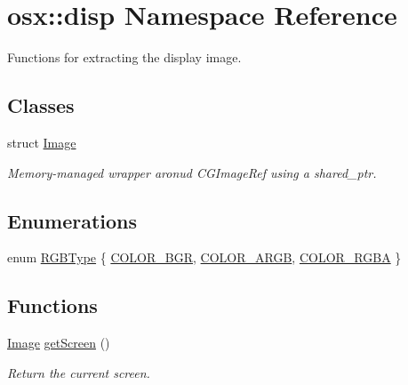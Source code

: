 \hypertarget{namespaceosx_1_1disp}{\section{osx\-:\-:disp Namespace Reference}
\label{namespaceosx_1_1disp}
}


Functions for extracting the display image.  


\subsection*{Classes}
\begin{DoxyCompactItemize}
\item 
struct \hyperlink{structosx_1_1disp_1_1_image}{Image}
\begin{DoxyCompactList}\small\item\em Memory-\/managed wrapper aronud {\ttfamily C\-G\-Image\-Ref} using a {\ttfamily shared\-\_\-ptr}. \end{DoxyCompactList}\end{DoxyCompactItemize}
\subsection*{Enumerations}
\begin{DoxyCompactItemize}
\item 
enum \hyperlink{namespaceosx_1_1disp_a63adf9b0b0b0365ec428dd44fc30c659}{R\-G\-B\-Type} \{ \hyperlink{namespaceosx_1_1disp_a63adf9b0b0b0365ec428dd44fc30c659ab96ecb2ad3c69bf9019d7ed4253603b1}{C\-O\-L\-O\-R\-\_\-\-B\-G\-R}, 
\hyperlink{namespaceosx_1_1disp_a63adf9b0b0b0365ec428dd44fc30c659a307b3e319b6708774c7672d7efc04d0d}{C\-O\-L\-O\-R\-\_\-\-A\-R\-G\-B}, 
\hyperlink{namespaceosx_1_1disp_a63adf9b0b0b0365ec428dd44fc30c659aefca227dbfbf6803b1248aceeaa187b7}{C\-O\-L\-O\-R\-\_\-\-R\-G\-B\-A}
 \}
\end{DoxyCompactItemize}
\subsection*{Functions}
\begin{DoxyCompactItemize}
\item 
\hyperlink{structosx_1_1disp_1_1_image}{Image} \hyperlink{namespaceosx_1_1disp_a7d7872e070a2742dc7408ef1e56f7960}{get\-Screen} ()
\begin{DoxyCompactList}\small\item\em Return the current screen. \end{DoxyCompactList}\end{DoxyCompactItemize}


